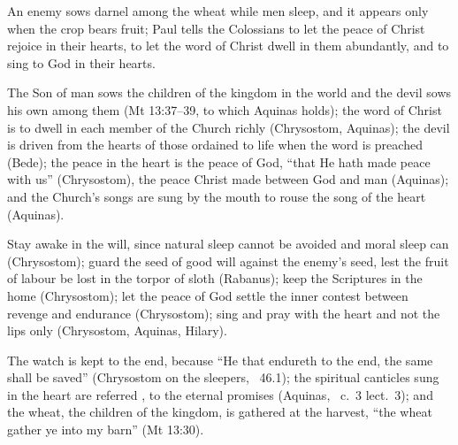 \begin{fourSenses}
\item[Literal.] An enemy sows darnel among the wheat while men sleep, and it
appears only when the crop bears fruit; Paul tells the Colossians to let the
peace of Christ rejoice in their hearts, to let the word of Christ dwell in
them abundantly, and to sing to God in their hearts.
\item[Allegorical.] The Son of man sows the children of the kingdom in the
world and the devil sows his own among them (Mt 13:37--39, to which Aquinas
holds); the word of Christ is to dwell in each member of the Church richly
(Chrysostom, Aquinas); the devil is driven from the hearts of those ordained
to life when the word is preached (Bede); the peace in the heart is the peace
of God, ``that He hath made peace with us'' (Chrysostom), the peace Christ
made between God and man (Aquinas); and the Church's songs are sung by the
mouth to rouse the song of the heart (Aquinas).
\item[Moral.] Stay awake in the will, since natural sleep cannot be avoided
and moral sleep can (Chrysostom); guard the seed of good will against the
enemy's seed, lest the fruit of labour be lost in the torpor of sloth
(Rabanus); keep the Scriptures in the home (Chrysostom); let
the peace of God settle the inner contest between revenge and endurance
(Chrysostom); sing and pray with the heart and not the lips only (Chrysostom,
Aquinas, Hilary).
\item[Anagogical.] The watch is kept to the end, because ``He that endureth
to the end, the same shall be saved'' (Chrysostom on the sleepers, \ 46.1); the spiritual canticles sung in the heart are referred
\latin{ad promissa aeterna}, to the eternal promises (Aquinas, \work{Super
Col.}\ c.~3 lect.~3); and the wheat, the children of the kingdom, is
gathered at the harvest, ``the wheat gather ye into my barn'' (Mt 13:30).
\end{fourSenses}
